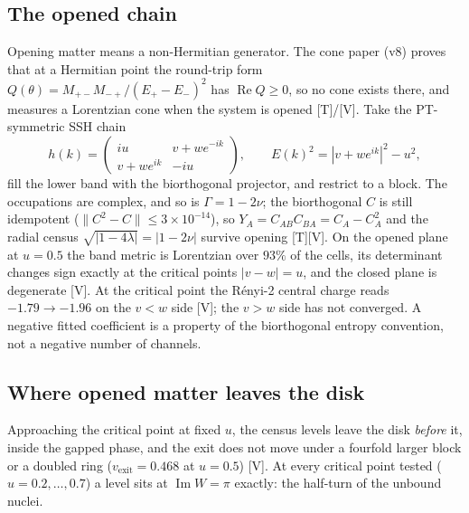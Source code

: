 \documentclass[11pt]{article}
\theoremstyle{definition}
\newcommand{\grade}[1]{\textsf{\small[#1]}}
\begin{document}
\subsection{The opened chain}
Opening matter means a non-Hermitian generator. The cone paper (v8) proves that at a Hermitian point the round-trip form $Q(\theta)=M_{+-}M_{-+}/(E_+-E_-)^2$ has $\operatorname{Re}Q\ge0$, so no cone exists there, and measures a Lorentzian cone when the system is opened \grade{T}/\grade{V}. Take the PT-symmetric SSH chain
\[
h(k)=\begin{pmatrix} iu & v+we^{-ik}\\ v+we^{ik} & -iu\end{pmatrix},\qquad E(k)^2=|v+we^{ik}|^2-u^2,
\]
fill the lower band with the biorthogonal projector, and restrict to a block. The occupations are complex, and so is $\Gamma=1-2\nu$; the biorthogonal $C$ is still idempotent ($\|C^2-C\|\le3\times10^{-14}$), so $Y_A=C_{AB}C_{BA}=C_A-C_A^2$ and the radial census $\sqrt{|1-4\lambda|}=|1-2\nu|$ survive opening \grade{T}\grade{V}. On the opened plane at $u=0.5$ the band metric is Lorentzian over $93\%$ of the cells, its determinant changes sign exactly at the critical points $|v-w|=u$, and the closed plane is degenerate \grade{V}. At the critical point the Rényi-2 central charge reads $-1.79\to-1.96$ on the $v<w$ side \grade{V}; the $v>w$ side has not converged. A negative fitted coefficient is a property of the biorthogonal entropy convention, not a negative number of channels.

\subsection{Where opened matter leaves the disk}
Approaching the critical point at fixed $u$, the census levels leave the disk \emph{before} it, inside the gapped phase, and the exit does not move under a fourfold larger block or a doubled ring ($v_{\mathrm{exit}}=0.468$ at $u=0.5$) \grade{V}. At every critical point tested ($u=0.2,\dots,0.7$) a level sits at $\operatorname{Im}W=\pi$ exactly: the half-turn of the unbound nuclei.
\end{document}
